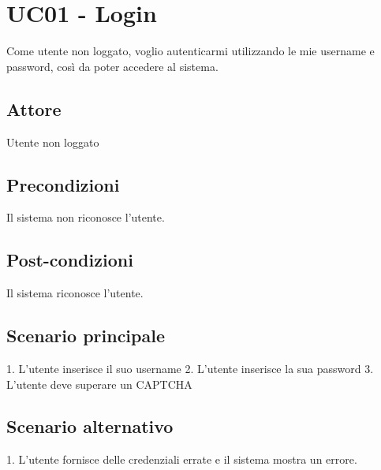\section{UC01 - Login}
Come utente non loggato, voglio autenticarmi utilizzando le mie username e password, così da poter accedere al sistema.
\subsection{Attore}
Utente non loggato
\subsection{Precondizioni}
Il sistema non riconosce l'utente.
\subsection{Post-condizioni}
Il sistema riconosce l'utente.
\subsection{Scenario principale}
1. L'utente inserisce il suo username
2. L'utente inserisce la sua password
3. L'utente deve superare un CAPTCHA
\subsection{Scenario alternativo}
1. L'utente fornisce delle credenziali errate e il sistema mostra un errore.